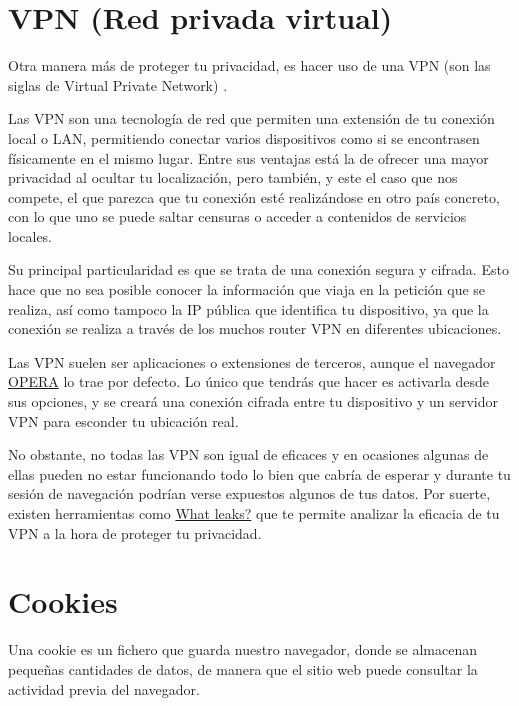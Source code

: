 \documentclass[
  a4paper,
  openany]{book}
\begin{document}
\hypertarget{vpn-red-privada-virtual}{%
\section{VPN (Red privada virtual)}\label{vpn-red-privada-virtual}}

Otra manera más de proteger tu privacidad, es hacer uso de una VPN (son las siglas de Virtual Private Network) \citep{AVAST-vpn}.

Las VPN son una tecnología de red que permiten una extensión de tu conexión local o LAN, permitiendo conectar varios dispositivos como si se encontrasen físicamente en el mismo lugar. Entre sus ventajas está la de ofrecer una mayor privacidad al ocultar tu localización, pero también, y este el caso que nos compete, el que parezca que tu conexión esté realizándose en otro país concreto, con lo que uno se puede saltar censuras o acceder a contenidos de servicios locales.

Su principal particularidad es que se trata de una conexión segura y cifrada. Esto hace que no sea posible conocer la información que viaja en la petición que se realiza, así como tampoco la IP pública que identifica tu dispositivo, ya que la conexión se realiza a través de los muchos router VPN en diferentes ubicaciones.

Las VPN suelen ser aplicaciones o extensiones de terceros, aunque el navegador \href{https://www.opera.com/es}{OPERA} lo trae por defecto. Lo único que tendrás que hacer es activarla desde sus opciones, y se creará una conexión cifrada entre tu dispositivo y un servidor VPN para esconder tu ubicación real.

No obstante, no todas las VPN son igual de eficaces y en ocasiones algunas de ellas pueden no estar funcionando todo lo bien que cabría de esperar y durante tu sesión de navegación podrían verse expuestos algunos de tus datos. Por suerte, existen herramientas como \href{https://whatleaks.com/}{What leaks?} que te permite analizar la eficacia de tu VPN a la hora de proteger tu privacidad.

\hypertarget{cookies}{%
\section{Cookies}\label{cookies}}

Una cookie es un fichero que guarda nuestro navegador, donde se almacenan pequeñas cantidades de datos, de manera que el sitio web puede consultar la actividad previa del navegador.
\end{document}
